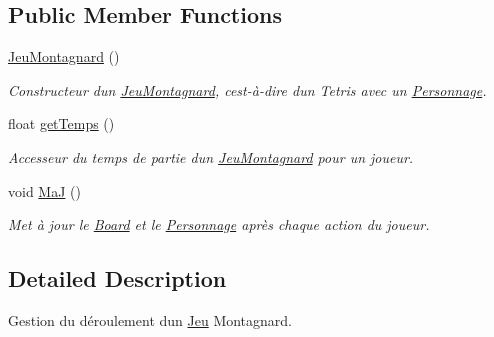 \subsection*{Public Member Functions}
\begin{DoxyCompactItemize}
\item 
\mbox{\label{classJeuMontagnard_a8513eb021dbe504977de86eda36a0cac}} 
\hyperlink{classJeuMontagnard_a8513eb021dbe504977de86eda36a0cac}{Jeu\+Montagnard} ()
\begin{DoxyCompactList}\small\item\em Constructeur d\textquotesingle{}un \hyperlink{classJeuMontagnard}{Jeu\+Montagnard}, c\textquotesingle{}est-\/à-\/dire d\textquotesingle{}un Tetris avec un \hyperlink{classPersonnage}{Personnage}. \end{DoxyCompactList}\item 
float \hyperlink{classJeuMontagnard_aa4934bcc49ec59f1fd922ab6466f7a9b}{get\+Temps} ()
\begin{DoxyCompactList}\small\item\em Accesseur du temps de partie d\textquotesingle{}un \hyperlink{classJeuMontagnard}{Jeu\+Montagnard} pour un joueur. \end{DoxyCompactList}\item 
\mbox{\label{classJeuMontagnard_a92ee3efc9d01dcf1ab224db9f88ff907}} 
void \hyperlink{classJeuMontagnard_a92ee3efc9d01dcf1ab224db9f88ff907}{MaJ} ()
\begin{DoxyCompactList}\small\item\em Met à jour le \hyperlink{classBoard}{Board} et le \hyperlink{classPersonnage}{Personnage} après chaque action du joueur. \end{DoxyCompactList}\end{DoxyCompactItemize}


\subsection{Detailed Description}
Gestion du déroulement d\textquotesingle{}un \hyperlink{classJeu}{Jeu} Montagnard. 

